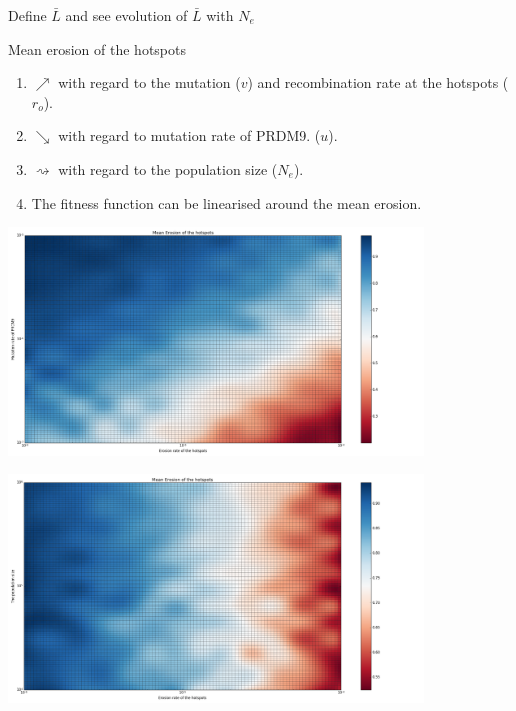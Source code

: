 \documentclass[10pt]{beamer}
\begin{document}
\begin{frame}
	\begin{center}
	\Large
    Define $\bar{L}$ and see evolution of $\bar{L}$ with $N_e$
	\end{center}
\end{frame}

\begin{frame}
	\begin{center}
		\Large
    	Mean erosion of the hotspots
	\end{center}
	\begin{enumerate}
		\item $\nearrow$ with regard to the mutation ($v$) and recombination rate at the hotspots ($r_o$).
		
		\item $\searrow$ with regard to mutation rate of PRDM9. ($u$).
		
		\item $\rightsquigarrow$ with regard to the population size ($N_e$).
		
		\item 	The fitness function can be linearised around the mean erosion.
	\end{enumerate}
\end{frame}

\begin{frame}
	\begin{center}
       \includegraphics[width=11cm]{Images/mean-erosion-mutation-erosion.png}
	\end{center}
\end{frame}

\begin{frame}
	\begin{center}
       \includegraphics[width=11cm]{Images/mean-erosion-population-erosion.png}
	\end{center}
\end{frame}
\end{document}
